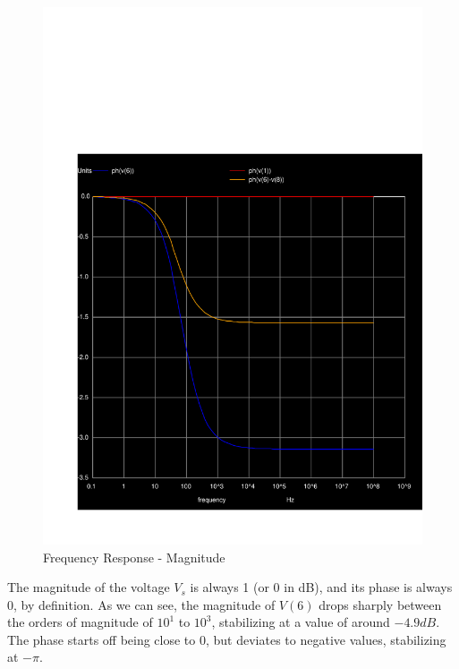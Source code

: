     \begin{figure}[H] \centering
        \includegraphics[width=1\linewidth]{../sim/phase5.pdf}
        \caption{Frequency Response - Magnitude}
        \label{fig:p5phase}
        \end{figure}

The magnitude of the voltage $V_s$ is always 1 (or 0 in dB), and its phase is always 0, by definition.
As we can see, the magnitude of $V(6)$ drops sharply between the orders of magnitude of $10^1$ to $10^3$,
stabilizing at a value of around $-4.9 dB$.
The phase starts off being close to 0, but deviates to negative values, stabilizing at $-\pi$.

